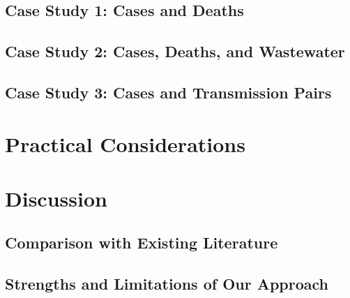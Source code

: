 \documentclass{article}
\begin{document}
\subsection{Case Study 1: Cases and Deaths}

\subsection{Case Study 2: Cases, Deaths, and Wastewater}

\subsection{Case Study 3: Cases and Transmission Pairs}

\section{Practical Considerations}


\section{Discussion}

\subsection{Comparison with Existing Literature}

\subsection{Strengths and Limitations of Our Approach}
\end{document}
